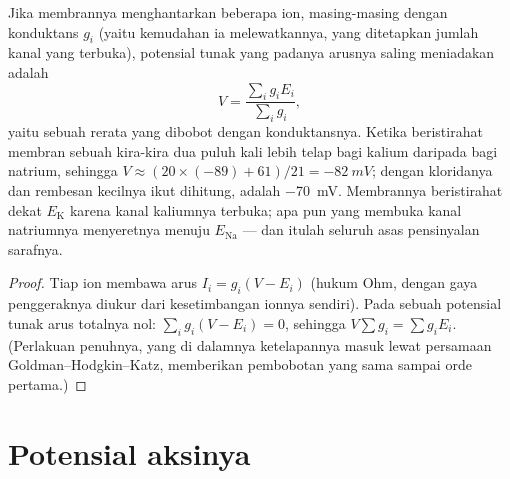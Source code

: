 \begin{theorem}\label{thm:b2:neurons-synapses:chord}
Jika membrannya menghantarkan beberapa ion, masing-masing dengan
konduktans $g_i$ (yaitu kemudahan ia melewatkannya, yang ditetapkan
jumlah kanal yang terbuka), potensial tunak yang padanya arusnya saling
meniadakan adalah
\[
V = \frac{\sum_i g_i E_i}{\sum_i g_i},
\]
yaitu sebuah rerata  yang dibobot dengan
konduktansnya. Ketika beristirahat membran sebuah  kira-kira dua
puluh kali lebih telap bagi kalium daripada bagi natrium, sehingga $V \approx (20\times(-89) +
61)/21 = \qty{-82}{mV}$; dengan kloridanya dan
rembesan kecilnya ikut dihitung,  adalah
\qty{-70}{mV}. Membrannya beristirahat dekat $E_{\mathrm K}$ karena
kanal kaliumnya terbuka; apa pun yang membuka kanal natriumnya
menyeretnya menuju $E_{\mathrm{Na}}$ --- dan itulah seluruh asas
pensinyalan sarafnya.
\end{theorem}
\begin{proof}
Tiap ion membawa arus $I_i = g_i(V - E_i)$ (hukum Ohm, dengan gaya
penggeraknya diukur dari kesetimbangan ionnya sendiri). Pada sebuah
potensial tunak arus totalnya nol: $\sum_i g_i(V - E_i) =
0$, sehingga
$V\sum g_i = \sum g_iE_i$. (Perlakuan penuhnya, yang di dalamnya
ketelapannya masuk lewat persamaan Goldman--Hodgkin--Katz, memberikan
pembobotan yang sama sampai orde pertama.)
\end{proof}

\section{Potensial aksinya}

